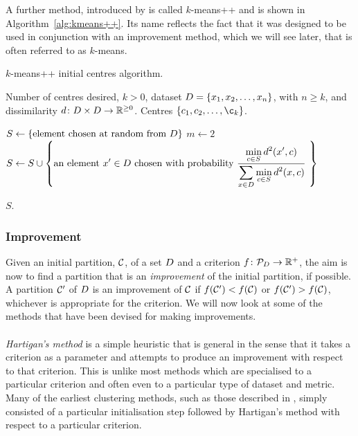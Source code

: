 A further method, introduced by \citet{arthur2007kmeans++} is called
$k$-means++ and is shown in Algorithm~\ref{alg:kmeans++}.  Its name reflects
the fact that it was designed to be used in conjunction with an improvement
method, which we will see later, that is often referred to as $k$-means.

\begin{algorithm}[h]
  \caption{$k$-means++ initial centres algorithm.}
  \label{alg:kmeans++}

  \begin{algorithmic}
    \Require Number of centres desired, $k > 0$, dataset $D =
             \{x_1,x_2,\dotsc,x_n\}$, with $n \geq k$, and dissimilarity
             $d \colon D \times D \to \mathbb{R}^{\geq 0}$.
    \Ensure Centres $\{c_1,c_2,\dotsc,\c_k\}$.

    \State $S \gets \{\text{element chosen at random from $D$}\}$
    \State $m \gets 2$
       \State $\displaystyle S \gets S \cup
               \left\{\text{an element $x' \in D$ chosen with probability
                            $\frac{\displaystyle \min_{c \in S} d^2(x',c)}
                             {\displaystyle
                              \sum_{x \in D} \min_{c \in S} d^2(x,c)}$
                            }\right\}$
    \EndWhile

    \State \Return $S$.
  \end{algorithmic}
\end{algorithm}

\subsubsection{Improvement}
\label{sec:improvement}

Given an initial partition, $\mathcal{C}$, of a set $D$ and a criterion $f
\colon \mathcal{P}_{D} \to \mathbb{R}^+$, the aim is now to find a partition
that is an \textit{improvement} of the initial partition, if possible.  A
partition $\mathcal{C}'$ of $D$ is an improvement of $\mathcal{C}$ if $f(\mathcal{C}') <
f(\mathcal{C})$ or $f(\mathcal{C}') > f(\mathcal{C})$, whichever is appropriate for the
criterion.  We will now look at some of the methods that have been devised for
making improvements.
\\\\
\noindent \textit{Hartigan's method} \citep{hartigan1975clustering} is a
simple heuristic that is general in the sense that it takes a criterion as a
parameter and attempts to produce an improvement with respect to that
criterion.  This is unlike most methods which are specialised to a particular
criterion and often even to a particular type of dataset and metric.  Many of
the earliest clustering methods, such as those described in \citep{everitt80},
simply consisted of a particular initialisation step followed by Hartigan's
method with respect to a particular criterion.

